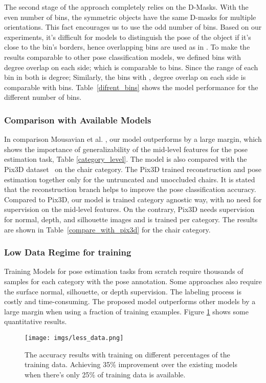 \documentclass[letterpaper, 10 pt, conference]{ieeeconf}  \pdfoutput=1
\begin{document}
The second stage of the approach completely relies on the D-Masks. With the even number of bins, the symmetric objects have the same D-masks for multiple orientations. This fact encourages us to use the odd number of bins. Based on our experiments, it's difficult for models to distinguish the pose of the object if it's close to the bin's borders, hence overlapping bins are used as in \cite{mousavian20173d}. 
To make the results comparable to other pose classification models, we defined  bins with  degree overlap on each side; which is comparable to  bins. Since the range of each bin in both is  degree; Similarly, the  bins with , degree overlap on each side is comparable with  bins. Table~\ref{difrent_bins} shows the model performance for the different number of bins.

\subsubsection{Comparison with Available Models}
In comparison Mousavian et al. \cite{mousavian20173d}, our model outperforms by a large margin, which shows the importance of generalizability of the mid-level features for the pose estimation task, Table \ref{category_level}. The model is also compared with the Pix3D dataset~\cite{pix3d} on the chair category. The Pix3D trained reconstruction and pose estimation together only for the untruncated and unoccluded chairs. It is stated that the reconstruction branch helps to improve the pose classification accuracy. Compared to Pix3D, our model is trained category agnostic way, with no need for supervision on the mid-level features. On the contrary, Pix3D needs supervision for normal, depth, and silhouette images and is trained per category. The results are shown in Table~\ref{compare_with_pix3d} for the chair category.










\subsubsection{Low Data Regime for training}
Training Models for pose estimation tasks from scratch require thousands of samples for each category with the pose annotation. Some approaches \cite{pix3d} also require the surface normal, silhouette, or depth supervision. The labeling process is costly and time-consuming. The proposed model outperforms other models by a large margin when using a fraction of training examples. Figure \ref{less-data} shows some quantitative results.
\begin{figure}[htbp]
\begin{center}
\texttt{[image: imgs/less\_data.png]}
\end{center}
   \caption{The accuracy results with training on different percentages of the training data. Achieving 35\% improvement over the existing models when there's only 25\% of training data is available.}
\label{less-data}
\end{figure}
\end{document}
